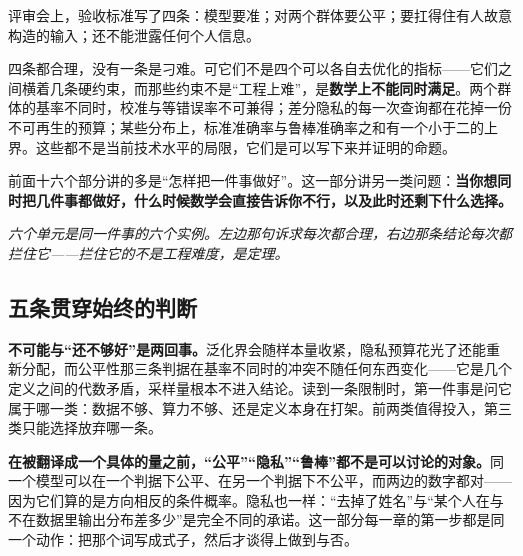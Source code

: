 评审会上，验收标准写了四条：模型要准；对两个群体要公平；要扛得住有人故意构造的输入；还不能泄露任何个人信息。

四条都合理，没有一条是刁难。可它们不是四个可以各自去优化的指标——它们之间横着几条硬约束，而那些约束不是``工程上难''，是\textbf{数学上不能同时满足}。两个群体的基率不同时，校准与等错误率不可兼得；差分隐私的每一次查询都在花掉一份不可再生的预算；某些分布上，标准准确率与鲁棒准确率之和有一个小于二的上界。这些都不是当前技术水平的局限，它们是可以写下来并证明的命题。

前面十六个部分讲的多是``怎样把一件事做好''。这一部分讲另一类问题：\textbf{当你想同时把几件事都做好，什么时候数学会直接告诉你不行，以及此时还剩下什么选择。}

\begin{center}

\emph{六个单元是同一件事的六个实例。左边那句诉求每次都合理，右边那条结论每次都拦住它——拦住它的不是工程难度，是定理。}
\end{center}

\subsection{五条贯穿始终的判断}

\textbf{不可能与``还不够好''是两回事。}泛化界会随样本量收紧，隐私预算花光了还能重新分配，而公平性那三条判据在基率不同时的冲突不随任何东西变化——它是几个定义之间的代数矛盾，采样量根本不进入结论。读到一条限制时，第一件事是问它属于哪一类：数据不够、算力不够、还是定义本身在打架。前两类值得投入，第三类只能选择放弃哪一条。

\textbf{在被翻译成一个具体的量之前，``公平''``隐私''``鲁棒''都不是可以讨论的对象。}同一个模型可以在一个判据下公平、在另一个判据下不公平，而两边的数字都对——因为它们算的是方向相反的条件概率。隐私也一样：``去掉了姓名''与``某个人在与不在数据里输出分布差多少''是完全不同的承诺。这一部分每一章的第一步都是同一个动作：把那个词写成式子，然后才谈得上做到与否。


